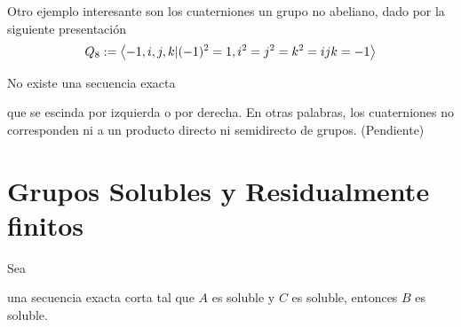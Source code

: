 \documentclass[11pt]{article}
\begin{document}
\noindent Otro ejemplo interesante son los cuaterniones un grupo no abeliano, dado por la 
siguiente presentación
\begin{equation*}
    Q_{8}:=\left\langle{-1,i,j,k|(-1)^{2}=1,i^{2}=j^{2}=k^{2}=ijk=-1}\right\rangle
\end{equation*}

\begin{ejm}
    No existe una secuencia exacta
    
    \vspace{2mm}
    \centerline{
    } \vspace{2mm}
    \noindent que se escinda por izquierda o por derecha. En otras palabras, los cuaterniones no
    corresponden ni a un producto directo ni semidirecto de grupos.
    (Pendiente)
\end{ejm}

\newpage
\section{Grupos Solubles y Residualmente finitos}

\begin{prop}
    Sea

    \centerline{
    } \vspace{2mm}
    una secuencia exacta corta tal que $A$ es soluble y $C$ es soluble, entonces $B$ es soluble.
\end{prop}

\end{document}
